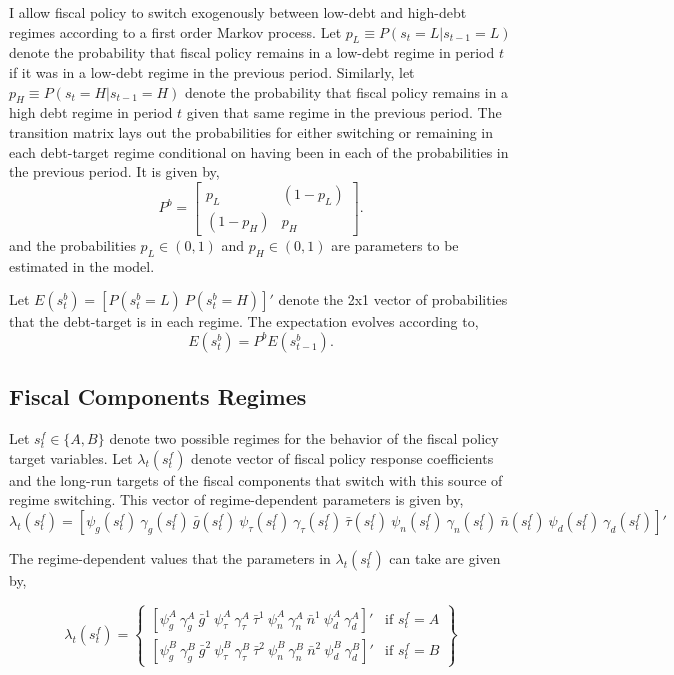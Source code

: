 \documentclass[11pt]{article}
\newcommand{\beq}{\begin{equation}}
\newcommand{\eeq}{\end{equation}}
\newcommand{\bdm}{\begin{displaymath}}
\newcommand{\edm}{\end{displaymath}}
\begin{document}
I allow fiscal policy to switch exogenously between low-debt and high-debt regimes according to a first order Markov process.  Let $p_L \equiv P(s_t=L | s_{t-1}=L)$ denote the probability that fiscal policy remains in a low-debt regime in period $t$ if it was in a low-debt regime in the previous period.  Similarly, let $p_H \equiv P(s_t=H | s_{t-1}=H)$ denote the probability that fiscal policy remains in a high debt regime in period $t$ given that same regime in the previous period.  The transition matrix lays out the probabilities for either switching or remaining in each debt-target regime conditional on having been in each of the probabilities in the previous period.  It is given by,
\beq P^b = \left[ \begin{array}{cc} p_L & (1-p_L) \\ (1-p_H) & p_H \end{array} \right]. \eeq
and the probabilities  $p_L \in (0,1)$ and $p_H \in (0,1)$ are parameters to be estimated in the model.

Let $E(s_t^b) = [ P(s_t^b=L) ~ P(s_t^b=H)]'$ denote the 2x1 vector of probabilities that the debt-target is in each regime.  The expectation evolves according to,
\bdm E(s_t^b) = P^b E(s_{t-1}^b). \edm

\subsection{Fiscal Components Regimes}

Let $s_t^f \in \{A,B\}$ denote two possible regimes for the behavior of the fiscal policy target variables.  Let $\lambda_t(s_t^f)$ denote vector of fiscal policy response coefficients and the long-run targets of the fiscal components that switch with this source of regime switching.  This vector of regime-dependent parameters is given by,
\bdm \lambda_t(s_t^f) = [\psi_g(s_t^f)~ \gamma_g(s_t^f)~ \bar{g}(s_t^f)~ \psi_\tau(s_t^f)~ \gamma_\tau(s_t^f)~ \bar{\tau}(s_t^f)~ \psi_n(s_t^f)~ \gamma_n(s_t^f)~ \bar{n}(s_t^f) ~ \psi_d(s_t^f)~ \gamma_d(s_t^f)]' \edm

The regime-dependent values that the parameters in $\lambda_t(s_t^f)$ can take are given by,

\beq \lambda_t(s_t^f) = \left\{ \begin{array}{ll}
  \left[ \psi_{g}^{A}~ \gamma_{g}^{A}~ \bar{g}^1~ \psi_{\tau}^{A}~ \gamma_{\tau}^{A}~ \bar{\tau}^1~ \psi_{n}^{A}~ \gamma_{n}^{A}~ \bar{n}^1 ~ \psi_{d}^{A}~ \gamma_{d}^{A} \right]' & \mbox{if }s_t^f = A \\
  \left[ \psi_{g}^{B}~ \gamma_{g}^{B}~ \bar{g}^2~ \psi_{\tau}^{B}~ \gamma_{\tau}^{B}~ \bar{\tau}^2~ \psi_{n}^{B}~ \gamma_{n}^{B}~ \bar{n}^2 ~ \psi_{d}^{B}~ \gamma_{d}^{B} \right]' & \mbox{if }s_t^f = B 
\end{array} \right\} \eeq
\end{document}
